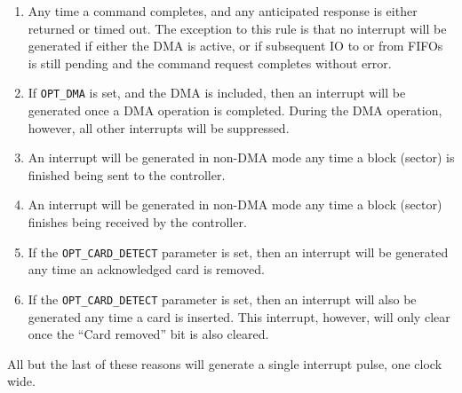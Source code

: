 \documentclass{gqtekspec}
\begin{document}
\begin{enumerate}
\item Any time a command completes, and any anticipated response is either
	returned or timed out.  The exception to this rule is that no interrupt
	will be generated if either the DMA is active, or if subsequent IO to
	or from FIFOs is still pending and the command request completes
	without error.
\item If {\tt OPT\_DMA} is set, and the DMA is included, then an interrupt will
	be generated once a DMA operation is completed.  During the DMA
	operation, however, all other interrupts will be suppressed.
\item An interrupt will be generated in non-DMA mode any time a block (sector)
	is finished being sent to the controller.
\item An interrupt will be generated in non-DMA mode any time a block (sector)
	finishes being received by the controller.
\item If the {\tt OPT\_CARD\_DETECT} parameter is set, then an interrupt
	will be generated any time an acknowledged card is removed.
\item If the {\tt OPT\_CARD\_DETECT} parameter is set, then an interrupt will
	also be generated any time a card is inserted.  This
	interrupt, however, will only clear once the ``Card removed'' bit is
	also cleared.
\end{enumerate}

All but the last of these reasons will generate a single interrupt pulse,
one clock wide.
\end{document}

